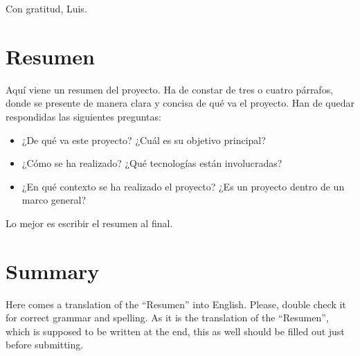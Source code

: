 \documentclass[a4paper, 12pt]{book}
\begin{document}
	Con gratitud,
	Luis.
	
	
	\chapter*{Resumen}
	
	Aquí viene un resumen del proyecto.
	Ha de constar de tres o cuatro párrafos, donde se presente de manera clara y concisa de qué va el proyecto. 
	Han de quedar respondidas las siguientes preguntas:
	
	\begin{itemize}
		\item ¿De qué va este proyecto? ¿Cuál es su objetivo principal?
		\item ¿Cómo se ha realizado? ¿Qué tecnologías están involucradas?
		\item ¿En qué contexto se ha realizado el proyecto? ¿Es un proyecto dentro de un marco general?
	\end{itemize}
	
	Lo mejor es escribir el resumen al final.
	
	
	\chapter*{Summary}
	
	Here comes a translation of the ``Resumen'' into English. 
	Please, double check it for correct grammar and spelling.
	As it is the translation of the ``Resumen'', which is supposed to be written at the end, this as well should be filled out just before submitting.
	
	
	
	
\end{document}
